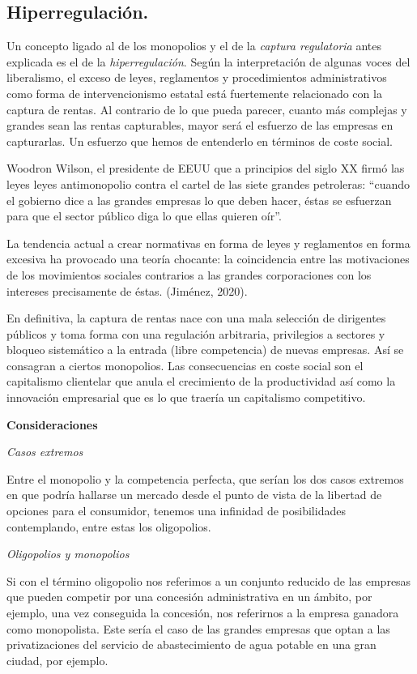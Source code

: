 \documentclass[
]{article}
\begin{document}
\hypertarget{hiperregulaciuxf3n.}{%
\subsection{Hiperregulación.}\label{hiperregulaciuxf3n.}}

Un concepto ligado al de los monopolios y el de la \emph{captura
regulatoria} antes explicada es el de la \emph{hiperregulación}. Según
la interpretación de algunas voces del liberalismo, el exceso de leyes,
reglamentos y procedimientos administrativos como forma de
intervencionismo estatal está fuertemente relacionado con la captura de
rentas. Al contrario de lo que pueda parecer, cuanto más complejas y
grandes sean las rentas capturables, mayor será el esfuerzo de las
empresas en capturarlas. Un esfuerzo que hemos de entenderlo en términos
de coste social.

Woodron Wilson, el presidente de EEUU que a principios del siglo XX
firmó las leyes leyes antimonopolio contra el cartel de las siete
grandes petroleras: ``cuando el gobierno dice a las grandes empresas lo
que deben hacer, éstas se esfuerzan para que el sector público diga lo
que ellas quieren oír''.

La tendencia actual a crear normativas en forma de leyes y reglamentos
en forma excesiva ha provocado una teoría chocante: la coincidencia
entre las motivaciones de los movimientos sociales contrarios a las
grandes corporaciones con los intereses precisamente de éstas. (Jiménez,
2020).

En definitiva, la captura de rentas nace con una mala selección de
dirigentes públicos y toma forma con una regulación arbitraria,
privilegios a sectores y bloqueo sistemático a la entrada (libre
competencia) de nuevas empresas. Así se consagran a ciertos monopolios.
Las consecuencias en coste social son el capitalismo clientelar que
anula el crecimiento de la productividad así como la innovación
empresarial que es lo que traería un capitalismo competitivo.

\textbf{Consideraciones}

\emph{Casos extremos}

Entre el monopolio y la competencia perfecta, que serían los dos casos
extremos en que podría hallarse un mercado desde el punto de vista de la
libertad de opciones para el consumidor, tenemos una infinidad de
posibilidades contemplando, entre estas los oligopolios.

\emph{Oligopolios y monopolios}

Si con el término oligopolio nos referimos a un conjunto reducido de las
empresas que pueden competir por una concesión administrativa en un
ámbito, por ejemplo, una vez conseguida la concesión, nos referirnos a
la empresa ganadora como monopolista. Este sería el caso de las grandes
empresas que optan a las privatizaciones del servicio de abastecimiento
de agua potable en una gran ciudad, por ejemplo.
\end{document}
